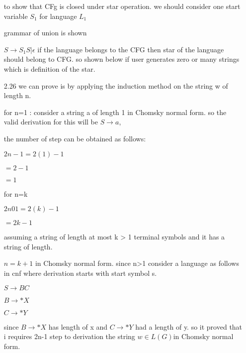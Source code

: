 \documentclass[11pt]{article}
\theoremstyle{thmstyle}
\begin{document}
\begin{itemize}
 
 to show that CFg is closed under star operation. we should consider one start variable $S_1$ for language $L_1$
 
 grammar of union is shown
 
 $S \longrightarrow S_1 S | \epsilon$ if the language belongs to the CFG then star of the language should belong to CFG. so shown below if user generates zero or many strings which is definition of the star. 

\item[2.26] we can prove is by applying the induction method on the string w of length n. 

for n=1 : consider a string a of length 1 in Chomsky normal form. so the valid derivation for this will be $S \longrightarrow a$,

the number of step can be obtained as follows:

$2n-1=2(1)-1$

$=2-1$

$=1$

for n=k 

$2n01 =2(k)-1$

$=2k-1$

assuming a string of length at most k > 1 terminal symbols and it has a string of length.

$n= k+1$ in Chomsky normal form. since n>1 consider a language as follows in cnf where derivation starts with start symbol s.

$S \longrightarrow BC$

$B \longrightarrow *X $

$C \longrightarrow *Y$

since $B \longrightarrow *X $ has length of x and $C \longrightarrow *Y$
had a length of y. so it proved that i requires 2n-1 step to derivation the string 
$w \in L(G) $in Chomsky normal form.

\end{itemize}
\end{document}
